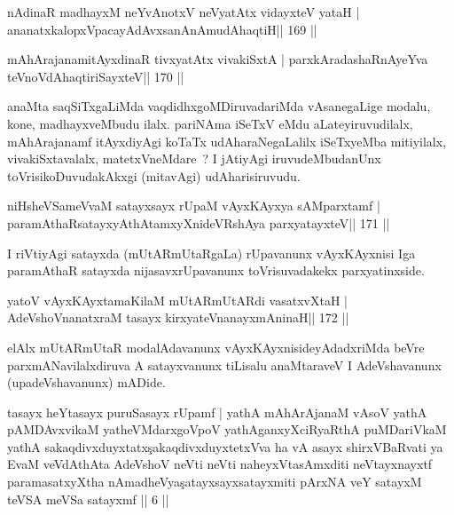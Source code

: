 
\begin{shl}
nA\s\s dinaR madhayxM neYvAnotxV neVyatAtx vidayxteV yataH |
ananatxkalopxVpacayAdAvxsanAnAmudAhaqtiH\hfill || 169 ||
\end{shl}

\begin{shl}
mAhArajanamitAyxdinaR tivxyatAtx vivakiSxtA |
parxkAradashaRnAyeYva teVnoVdAhaqtiriSayxteV\hfill || 170 ||
\end{shl}

\begin{artha}
anaMta saqSiTxgaLiMda vaqdidhxgoMDiruvadariMda vAsanegaLige modalu,
kone, madhayxveMbudu ilalx. pariNAma iSeTxV eMdu aLateyiruvudilalx,
mAhArajanamf itAyxdiyAgi koTaTx udAharaNegaLalilx iSeTxyeMba
mitiyilalx, vivakiSxtavalalx, matetxVneMdare~? I jAtiyAgi
iruvudeMbudanUnx toVrisikoDuvudakAkxgi (mitavAgi) udAharisiruvudu.
\end{artha}

\begin{shl}
niHsheVSameVvaM satayxsayx rUpaM vAyxKAyxya sAMparxtamf |
paramAthaRsatayxyAthAtamxyXnideVRshAya parxyatayxteV\hfill || 171 ||
\end{shl}

\begin{artha}
I riVtiyAgi satayxda (mUtARmUtaRgaLa) rUpavanunx vAyxKAyxnisi Iga
paramAthaR satayxda nijasavxrUpavanunx toVrisuvadakekx parxyatinxside.
\end{artha}

\begin{shl}
yatoV vAyxKAyxtamaKilaM mUtARmUtARdi vasatxvXtaH |
AdeVshoV\s nanatxraM tasayx kirxyateV\s nanayxmAninaH\hfill || 172 ||
\end{shl}

\begin{artha}
elAlx mUtARmUtaR modalAdavanunx vAyxKAyxnisideyAdadxriMda beVre
parxmANavilalxdiruva A satayxvanunx tiLisalu anaMtaraveV I
AdeVshavanunx (upadeVshavanunx) mADide.
\end{artha}



\begin{kandikeshl}
tasayx heYtasayx puruSasayx rUpamf | yathA mAhArAjanaM
vAsoV yathA pAMDAvxvikaM yatheVMdarxgoVpoV yathAganxyXciRyaRthA
puMDariVkaM yathA sakaqdivxduyxtatx\c sakaqdivxduyxtetxVva
ha vA asayx shirxVBaRvati ya EvaM veVdAthAta
AdeVshoV neVti neVti naheyxVtasAmxditi neVtayxnayxtf 
paramasatxyXtha nAmadheVya\c satayxsayxsatayxmiti pArxNA veY
satayxM teVSA meVSa satayxmf || 6 ||
\end{kandikeshl}

